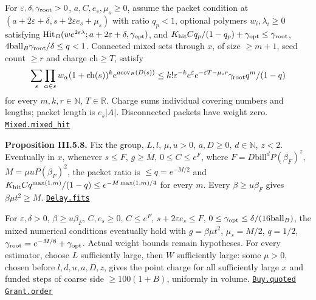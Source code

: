 \documentclass[
  letterpaper,
  11pt]{article}
\begin{document}
For \(\varepsilon,\delta,\gamma_{\rm root}>0\), \(a,C,e_s,\mu_s\ge0\),
assume the packet condition at
\((a+2\varepsilon+\delta,s+2\varepsilon e_s+\mu_s)\) with ratio
\(q_p<1\), optional polymers \(w_i,\lambda_i\ge0\) satisfying
\(\mathrm{Hit}_B(we^{2\varepsilon\lambda};a+2\varepsilon+\delta,\gamma_{\rm opt})\),
and \(K_{\rm hit}Cq_p/(1-q_p)+\gamma_{\rm opt}\le\gamma_{\rm root}\),
\(4\mathrm{ball}_B\gamma_{\rm root}/\delta\le q<1\). Connected mixed
sets through \(x\), of size \(\ge m+1\), seed count \(\ge r\) and charge
\(\mathrm{ch}\ge T\), satisfy
\[\sum_s\prod_{\alpha\in s}w_\alpha(1+\mathrm{ch}(s))^ke^{a\mathrm{cov}_B(D(s))}\le k!\varepsilon^{-k}e^\varepsilon e^{-\varepsilon T-\mu_sr}\gamma_{\rm root}q^m/(1-q)\]
for every \(m,k,r\in\mathbb N\), \(T\in\mathbb R\). Charge sums
individual covering numbers and lengths; packet length is \(e_s|A|\).
Disconnected packets have weight zero.
\href{https://github.com/yang-mills-group/OpenAI-YM-20261028/blob/3456e5e75cf8d4cd558955a5c7638fba2d68f464/YM/Push/ABSOLUTE_SUMS/Mixed.lean\#L153-L189}{\texttt{Mixed.mixed\_hit}}

\textbf{Proposition III.5.8.} Fix the group, \(L,l\), \(\mu,u>0\),
\(a,D\ge0\), \(d\in\mathbb N\), \(z<2\). Eventually in \(x\), whenever
\(s\le F\), \(g\ge M\), \(0\le C\le e^F\), where
\(F=D\mathrm{bill}^dP(\beta_F)^z\), \(M=\mu uP(\beta_F)^2\), the packet
ratio is \(\le q=e^{-M/2}\) and
\(K_{\rm hit}Cq^{\max(1,m)}/(1-q)\le e^{-M\max(1,m)/4}\) for every
\(m\). Every \(\beta\ge u\beta_F\) gives \(\beta\mu t^2\ge M\).
\href{https://github.com/yang-mills-group/OpenAI-YM-20261028/blob/3456e5e75cf8d4cd558955a5c7638fba2d68f464/YM/Push/ABSOLUTE_SUMS/Delay.lean\#L165-L214}{\texttt{Delay.fits}}

For \(\varepsilon,\delta>0\), \(\beta\ge u\beta_F\), \(C,e_s\ge0\),
\(C\le e^F\), \(s+2\varepsilon e_s\le F\),
\(0\le\gamma_{\rm opt}\le\delta/(16\mathrm{ball}_B)\), the mixed
numerical conditions eventually hold with \(g=\beta\mu t^2\),
\(\mu_s=M/2\), \(q=1/2\),
\(\gamma_{\rm root}=e^{-M/8}+\gamma_{\rm opt}\). Actual weight bounds
remain hypotheses. For every estimator, choose \(L\) sufficiently large,
then \(W\) sufficiently large: some \(\mu>0\), chosen before
\(l,d,u,a,D,z\), gives the point charge for all sufficiently large \(x\)
and funded steps of coarse side \(\ge100(1+B)\), uniformly in volume.
\href{https://github.com/yang-mills-group/OpenAI-YM-20261028/blob/3456e5e75cf8d4cd558955a5c7638fba2d68f464/YM/Push/ABSOLUTE_SUMS/Buy.lean\#L67-L103}{\texttt{Buy.quoted}}
\href{https://github.com/yang-mills-group/OpenAI-YM-20261028/blob/3456e5e75cf8d4cd558955a5c7638fba2d68f464/YM/Push/ABSOLUTE_SUMS/Grants.lean\#L52-L71}{\texttt{Grant.order}}
\end{document}
